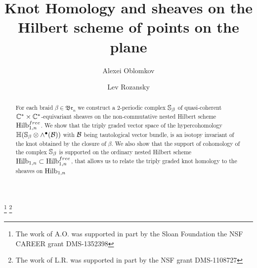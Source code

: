 \documentclass[10pt]{amsart}
\begin{document}
\newcommand{\frb}{\mathfrak{b}}
\newcommand{\frh}{\mathfrak{h}}
\newcommand{\frn}{\mathfrak{n}}
\newcommand{\frt}{\mathfrak{t}}
\newcommand{\gl}{\mathfrak{gl}}
\newcommand{\frg}{\mathfrak{g}}
\newcommand{\frq}{\mathfrak{q}}

\newcommand{\Brgr}{\mathfrak{Br}}

\newcommand{\Icr}{\mathcal{I}^{crit}}
\newcommand{\Spec}{\mathrm{Spec}}
\newcommand{\Ann}{\mathrm{Ann}}
\newcommand{\Brgrn}{\Brgr_n}



\newcommand{\Wr}{\overline{W}}


\newcommand{\Tsc}{T_{sc}}
\newcommand{\GL}{\mathrm{GL}}



\thanks{The work of A.O. was supported in part by the Sloan Foundation the NSF CAREER grant DMS-1352398}
\thanks{The work of L.R. was supported in part by  the NSF grant DMS-1108727}


\title{Knot Homology and sheaves on the Hilbert scheme of points on the plane}
\author[A.~Oblomkov]{Alexei Oblomkov}
\address{
A.~Oblomkov\\
Department of Mathematics and Statistics\\
University of Massachusetts at Amherst\\
Lederle Graduate Research Tower\\
710 N. Pleasant Street\\
Amherst, MA 01003 USA
}


\author[L.~Rozansky]{Lev Rozansky}
\address{
L.~Rozansky\\
Department of Mathematics\\
University of North Carolina at Chapel Hill\\
CB \# 3250, Phillips Hall\\
Chapel Hill, NC 27599 USA
}




\begin{abstract} For each braid $\beta\in \Brgrn$ we construct a $2$-periodic complex $\mathbb{S}_\beta$ of  quasi-coherent $\mathbb{C}^*\times \mathbb{C}^*$-equivariant sheaves  on the non-commutative nested Hilbert
scheme $\mathrm{Hilb}_{1,n}^{free}$.
We show that
the triply graded vector space of the hypercohomology $ \mathbb{H}( \mathbb{S}_{\beta}\otimes \wedge^\bullet (\mathcal{B}))$ with $\mathcal{B}$ being tautological vector bundle, is an isotopy invariant of the  knot obtained by the
closure of $\beta$. We also show that the support of cohomology of the complex $\mathbb{S}_\beta$ is supported on the ordinary nested Hilbert
scheme $\mathrm{Hilb}_{1,n}\subset\mathrm{Hilb}_{1,n}^{free}$, that allows us to relate the triply graded knot homology to the sheaves on $\mathrm{Hilb}_{1,n}$ \end{abstract}
\end{document}
